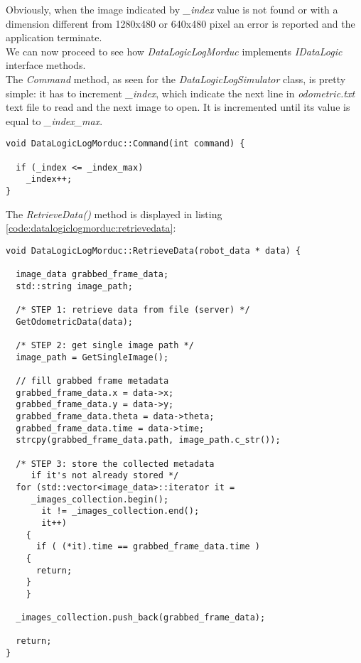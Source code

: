 Obviously, when the image indicated by \textit{\_index} value is
not found or with a dimension different from 1280x480 or
640x480 pixel an error is reported and the application terminate.
\\
We can now proceed to see how \textit{DataLogicLogMorduc} implements
\textit{IDataLogic} interface methods.
\\
The \textit{Command} method, as seen for the \textit{DataLogicLogSimulator}
class, is pretty simple: it has to increment \textit{\_index},
which indicate the next line in \textit{odometric.txt}
text file to read and the next image to open. It is incremented until
its value is equal to \textit{\_index\_max}.
\\
\begin{lstlisting}[caption={\texttt{DataLogicLogMorduc::Command() method}},
    label={code:datalogiclogmorduc:command}]
void DataLogicLogMorduc::Command(int command) {

  if (_index <= _index_max)
    _index++;
}
\end{lstlisting}

The \textit{RetrieveData()} method is displayed in listing
\ref{code:datalogiclogmorduc:retrievedata}:
\\
\begin{lstlisting}[caption={\texttt{DataLogicLogMorduc::RetrieveData()} method},
    label={code:datalogiclogmorduc:retrievedata}]
void DataLogicLogMorduc::RetrieveData(robot_data * data) {

  image_data grabbed_frame_data;
  std::string image_path;

  /* STEP 1: retrieve data from file (server) */
  GetOdometricData(data);

  /* STEP 2: get single image path */
  image_path = GetSingleImage();
   
  // fill grabbed frame metadata
  grabbed_frame_data.x = data->x;
  grabbed_frame_data.y = data->y;
  grabbed_frame_data.theta = data->theta;
  grabbed_frame_data.time = data->time;
  strcpy(grabbed_frame_data.path, image_path.c_str());

  /* STEP 3: store the collected metadata
     if it's not already stored */
  for (std::vector<image_data>::iterator it =
	 _images_collection.begin();
       it != _images_collection.end();
       it++)
    {
      if ( (*it).time == grabbed_frame_data.time )
	{
	  return;
	}
    }

  _images_collection.push_back(grabbed_frame_data);
  
  return;
}
\end{lstlisting}

